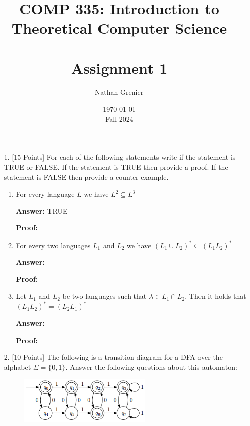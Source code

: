 \documentclass[12pt]{article}
\title{COMP 335: Introduction to Theoretical Computer Science\\
\ \\
Assignment 1}
\author{Nathan Grenier}
\date{\today \\ Fall 2024}
\begin{document}
\maketitle

\newpage

\begin{enumerate}

	\item[1.] [15 Points] For each of the following statements write if the statement is TRUE or FALSE. If the statement is TRUE then provide a proof. If the statement is FALSE then provide a counter-example.

	      \begin{enumerate}

		      \item For every language $L$ we have $L^2 \subseteq L^3$

		            \noindent \textbf{Answer:} TRUE

		            \noindent \textbf{Proof:}

		      \item For every two languages $L_1$ and $L_2$ we have $(L_1 \cup L_2)^* \subseteq (L_1L_2)^*$

		            \noindent \textbf{Answer:}

		            \noindent \textbf{Proof:}

		      \item Let $L_1$ and $L_2$ be two languages such that $\lambda \in L_1 \cap L_2$. Then it holds that $(L_1L_2)^* = (L_2L_1)^*$

		            \noindent \textbf{Answer:}

		            \noindent \textbf{Proof:}

	      \end{enumerate}

	      \newpage

	\item[2.] [10 Points] The following is a transition diagram for a DFA over the alphabet $\Sigma = \{0,1\}$. Answer the following questions about this automaton:

	      \begin{figure}[h!]
		      \centering
		      \includegraphics[width=0.6\textwidth]{img/q2/q2_automata.png}
	      \end{figure}


\end{enumerate}
\end{document}
